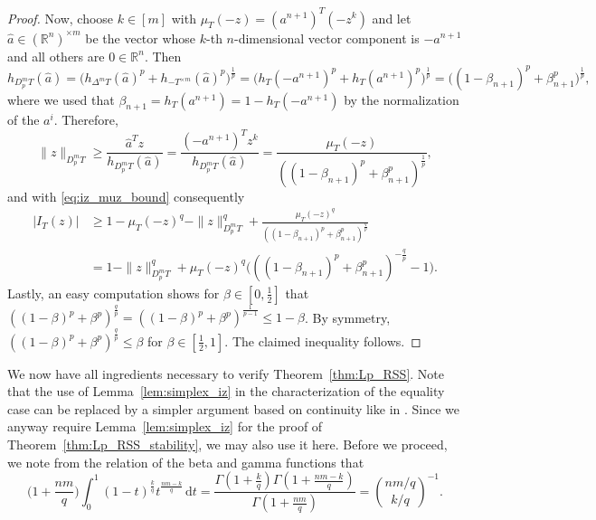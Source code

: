 \documentclass{amsart}
\newcommand\R{\mathbb{R}}
\newcommand{\dd}{\,\mathrm{d}}
\newcommand{\diff}[3]{D_{#1}^{#2} #3}
\newcommand{\diag}[2]{\Delta^{#1} #2}
\newcommand{\interval}[4]{I_{#3} (#4)}
\newcommand{\simplexscaling}[2]{\mu_{#1}(#2)}
\newcommand{\cartesian}[2]{#1^{\times #2}}
\begin{document}
\begin{proof}
Now, choose $k \in [m]$ with $\simplexscaling{T}{-z} = (a^{n+1})^T (-z^k)$ and let $\hat a \in \cartesian{(\R^n)}{m}$ be the vector
whose $k$-th $n$-dimensional vector component is $-a^{n+1}$ and all others are $0 \in \R^n$.
Then
\[
	h_{\diff{p}{m}{T}}(\hat a)
	= \big( h_{\diag{m}{T}} (\hat a)^p + h_{-\cartesian{T}{m}} (\hat a)^p \big)^{\frac{1}{p}}
	= \big( h_T(-a^{n+1})^p + h_T(a^{n+1})^p \big)^{\frac{1}{p}}
	= \big( (1-\beta_{n+1})^p + \beta_{n+1}^p \big)^{\frac{1}{p}},
\]
where we used that $\beta_{n+1} = h_T(a^{n+1}) = 1 - h_T(-a^{n+1})$ by the normalization of the $a^i$.
Therefore,
\[
	\|z\|_{\diff{p}{m}{T}}
	\geq \frac{\hat a^T z}{h_{\diff{p}{m}{T}} (\hat a)}
	= \frac{(-a^{n+1})^T z^k}{h_{\diff{p}{m}{T}} (\hat a)}
	= \frac{\simplexscaling{T}{-z}}{( (1-\beta_{n+1})^p + \beta_{n+1}^p )^{\frac{1}{p}}},
\]
and with \eqref{eq:iz_muz_bound} consequently
\begin{align*}
	|\interval{p}{m}{T}{z}|
	& \geq 1 - \simplexscaling{T}{-z}^q - \|z\|_{\diff{p}{m}{T}}^q + \frac{\simplexscaling{T}{-z}^q}{( (1-\beta_{n+1})^p + \beta_{n+1}^p )^{\frac{q}{p}}}
    \\
	& = 1 - \|z\|_{\diff{p}{m}{T}}^q + \simplexscaling{T}{-z}^q \Big( ( (1-\beta_{n+1})^p + \beta_{n+1}^p )^{-\frac{q}{p}} - 1 \Big).
\end{align*}
Lastly, an easy computation shows for $\beta \in [0,\frac{1}{2}]$ that
$((1-\beta)^p + \beta^p )^{\frac{q}{p}} = ((1-\beta)^p + \beta^p )^{\frac{1}{p-1}} \leq 1-\beta$.
By symmetry, $((1-\beta)^p + \beta^p )^{\frac{q}{p}} \leq \beta$ for $\beta \in [\frac{1}{2},1]$.
The claimed inequality follows.
\end{proof}

We now have all ingredients necessary to verify Theorem~\ref{thm:Lp_RSS}.
Note that the use of Lemma~\ref{lem:simplex_iz} in the characterization of the equality case can be replaced by a simpler argument based on continuity like in \cite{2026:KotrbatyMouamine}.
Since we anyway require Lemma~\ref{lem:simplex_iz} for the proof of Theorem~\ref{thm:Lp_RSS_stability}, we may also use it here.
Before we proceed, we note from the relation of the beta and gamma functions that
\begin{equation}\label{eq:beta_gamma}
    \bigg( 1 + \frac{nm}{q} \bigg) \int_0^1 (1-t)^\frac{k}{q} t^{\frac{nm-k}{q}} \dd t
    = \frac{\Gamma(1+\frac{k}{q}) \Gamma(1+\frac{nm-k}{q})}{\Gamma(1+\frac{nm}{q})}
    = \binom{nm/q}{k/q}^{-1}.
\end{equation}
\end{document}
